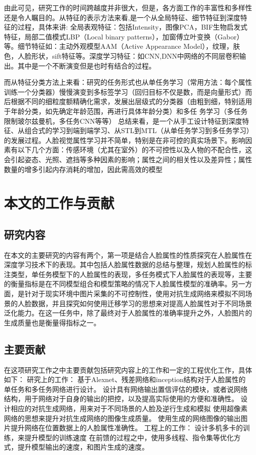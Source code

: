 由此可见，研究工作的时间跨越度并非很大，但是，各方面工作的丰富性和多样性还是令人瞩目的。从特征的表示方法来看,是一个从全局特征、细节特征到深度特征的过程，具体来讲:
全局表观特征：包括Intensity，图像PCA，BIF生物启发式特征，局部二值模式LBP（Local binary patterns），加窗傅立叶变换（Gabor）等。细节特征如：主动外观模型AAM（Active  Appearance  Model），纹理，肤色，人脸形状，sift特征等。深度学习特征：如CNN,DNN中网络的不同层卷积输出。其中是一个不断演变但是也时有结合的过程。

而从特征分类方法上来看：研究的任务形式也从单任务学习（常用方法：每个属性训练一个分类器）慢慢演变到多标签学习（回归目标不仅是数，而是向量形式）而后根据不同的细粒度额精确化需求，发展出层级式的分类器（由粗到细，特别适用于年龄分类，如先确定年龄范围，再进行具体年龄分类）和多任
务学习（多任务限制玻尔兹曼机，多任务CNN等等）
总结来看，是一个从手工设计特征到深度特征、从组合式的学习到端到端学习、从STL到MTL（从单任务学习到多任务学习）的发展过程。人脸视觉属性学习并不简单，特别是在非可控的真实场景下。影响因素有以下几个方面：传感环境（尤其在室外）的不可控性以及人物的不配合性，这会引起姿态、光照、遮挡等多种因素的影响；属性之间的相关性以及差异性；属性数量的增多引起内存消耗的增加，因此需高效的模型
\section{本文的工作与贡献}
\subsection{研究内容}
在本文的主要研究的内容有两个，第一项是结合人脸属性的性质探究在人脸属性在深度学习技术下的表现。其中包括人脸属性数据的总结与整理，规划人脸属性的标注类型，单任务模型下的人脸属性的表现，多任务模式下人脸属性的表现等，主要的衡量指标是在不同模型组合和模型策略的情况下人脸属性模型的准确率。另一方面，是针对于现实环境中图片采集的不可控制性，使用对抗生成网络来模拟不同场景的人脸数据，并且探究如何使用迁移学习的思想来对提高人脸属性对于不同场景泛化能力。在这一任务中，除了最终对于人脸属性的准确率提升之外，人脸图片的生成质量也是衡量得指标之一。
\subsection{主要贡献}
在这项研究工作之中主要贡献包括研究内容上的工作和一定的工程优化工作，具体如下：
研究上的工作：
基于Alexnet、残差网络和inception结构对于人脸属性的单任务和多任务网络进行设计。
设计具有网络输出置信评估的模块，或者说网络结构，用于网络对于自身的输出的把控，以及提高实际使用的方便和准确性。
设计相应的对抗生成网络，用来对于不同场景的人脸及逆行生成和模拟
使用超像素网络的思想来提升对抗生成网络的图像生成质量。
使用生成的网络图像的输出图片提升网络在位置数据上的人脸属性准确性。
工程上的工作：
设计多机多卡的训练，来提升模型的训练速度
在前馈的过程之中，使用多线程、指令集等优化方式，提升模型输出的速度，和图片生成的速度。
